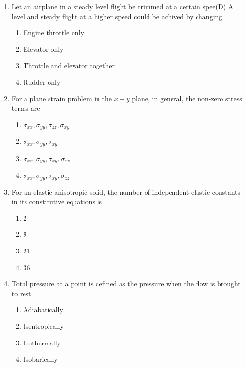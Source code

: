 \documentclass{article}
\begin{document}
\begin{enumerate}
    \item Let an airplane in a steady level flight be trimmed at a certain spee(D) A level and steady flight at a higher speed could be achived by changing 
    \begin{enumerate}
        \item Engine throttle only
        \item Elevator only
        \item Throttle and elevator together
        \item Rudder only
    \end{enumerate}
        

    \item For a plane strain problem in the $x-y$ plane, in general, the non-zero stress terms are 
    \begin{multicols}{2}
    \begin{enumerate}
        \item $\sigma_{xx}, \sigma_{yy}, \sigma_{zz}, \sigma_{xy}$ 
        \item $\sigma_{xx}, \sigma_{yy}, \sigma_{xy}$ 
        \item $\sigma_{xx}, \sigma_{yy}, \sigma_{xy}, \sigma_{xz}$ 
        \item $\sigma_{xx}, \sigma_{yy}, \sigma_{xy}, \sigma_{zz}$
    \end{enumerate}
    \end{multicols}
        

    \item For an elastic anisotropic solid, the number of independent elastic constants in its constitutive equations is 
    \begin{multicols}{4}
    \begin{enumerate}
        \item 2 
        \item 9 
        \item 21 
        \item 36
    \end{enumerate}
    \end{multicols}
        

    \item Total pressure at a point is defined as the pressure when the flow is brought to rest 
    \begin{enumerate}
        \item Adiabatically
        \item Isentropically
        \item Isothermally
        \item Isobarically
    \end{enumerate}
        


\end{enumerate}
\end{document}
